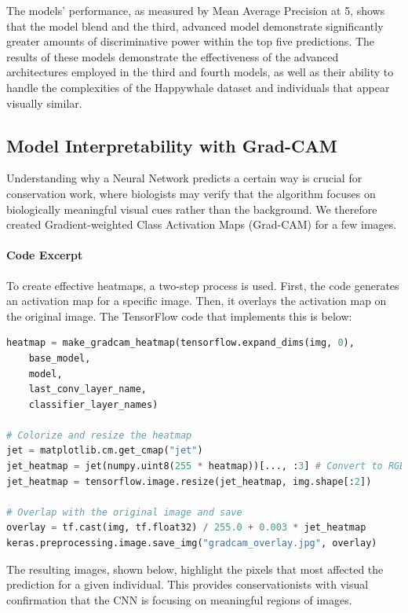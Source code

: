\documentclass[twocolumn]{article}
\begin{document}
The models’ performance, as measured by Mean Average Precision at 5, shows that the model blend and the third, advanced model demonstrate significantly greater amounts of discriminative power within the top five predictions. The results of these models demonstrate the effectiveness of the advanced architectures employed in the third and fourth models, as well as their ability to handle the complexities of the Happywhale dataset and individuals that appear visually similar.

\subsection{Model Interpretability with Grad-CAM}

Understanding why a Neural Network predicts a certain way is crucial for conservation work, where biologists may verify that the algorithm focuses on biologically meaningful visual cues rather than the background. We therefore created Gradient-weighted Class Activation Maps (Grad-CAM) for a few images. 

\paragraph{Code Excerpt}

To create effective heatmaps, a two-step process is used. First, the code generates an activation map for a specific image. Then, it overlays the activation map on the original image. The TensorFlow code that implements this is below:

\begin{lstlisting}[language=Python,basicstyle=\footnotesize\ttfamily]
heatmap = make_gradcam_heatmap(tensorflow.expand_dims(img, 0),
    base_model,
    model,
    last_conv_layer_name,
    classifier_layer_names)

# Colorize and resize the heatmap
jet = matplotlib.cm.get_cmap("jet")
jet_heatmap = jet(numpy.uint8(255 * heatmap))[..., :3] # Convert to RGB
jet_heatmap = tensorflow.image.resize(jet_heatmap, img.shape[:2])

# Overlap with the original image and save
overlay = tf.cast(img, tf.float32) / 255.0 + 0.003 * jet_heatmap
keras.preprocessing.image.save_img("gradcam_overlay.jpg", overlay)
\end{lstlisting}
The resulting images, shown below, highlight the pixels that most affected the prediction for a given individual. This provides conservationists with visual confirmation that the CNN is focusing on meaningful regions of images.
\end{document}
